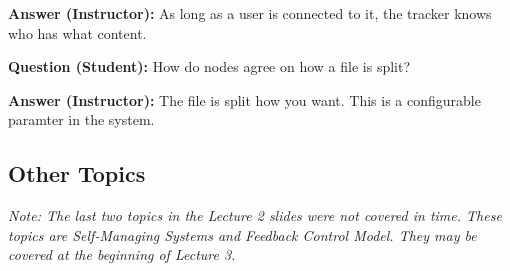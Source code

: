 \documentclass[twoside]{article}
\begin{document}
\textbf{Answer (Instructor): } As long as a user is connected to it, the tracker knows who has what content.

\textbf{Question (Student): } How do nodes agree on how a file is split?

\textbf{Answer (Instructor): } The file is split how you want. This is a configurable paramter in the system.



\subsection{Other Topics}

\textit{Note: The last two topics in the Lecture 2 slides were not covered in time. These topics are Self-Managing Systems and Feedback Control Model. They may be covered at the beginning of Lecture 3.}
\end{document}
